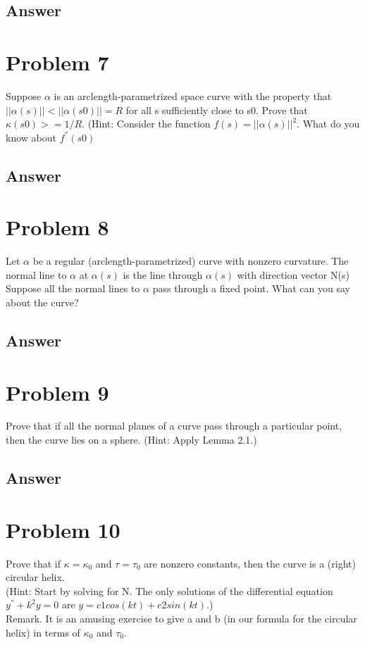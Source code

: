 \documentclass[
	12pt, %
]{fphw}
\theoremstyle{plain}
\begin{document}
\subsection*{Answer}
\section*{Problem 7}
\begin{problem}
     Suppose \(\alpha\) is an arclength-parametrized space curve with the property that $||\alpha(s)||<||\alpha(s0)|| = R$ for
all s sufficiently close to s0. Prove that \(\kappa(s0) >= 1/R\). (Hint: Consider the function $f (s) = ||\alpha(s)||^{2}$.
What do you know about \(f^{''} (s0)\)
\end{problem}
\subsection*{Answer}
\section*{Problem 8}
\begin{problem}
     Let $\alpha$ be a regular (arclength-parametrized) curve with nonzero curvature. The normal line to $\alpha$ at $\alpha(s)$
is the line through $\alpha(s)$ with direction vector N(s) Suppose all the normal lines to $\alpha$ pass through a fixed point. What can you say about the curve?
\end{problem}
\subsection*{Answer}
\section*{Problem 9}
\begin{problem}
     Prove that if all the normal planes of a curve pass through a particular point, then the curve lies on a sphere. (Hint: Apply Lemma 2.1.)
\end{problem}
\subsection*{Answer}
\section*{Problem 10}
\begin{problem}
     Prove that if $\kappa = \kappa_{0}$ and $\tau = \tau_{0}$ are nonzero constants, then the curve is a (right) circular helix.\\
     (Hint: Start by solving for N. The only solutions of the differential equation $y^{''} + k^2 y = 0$ are $y = c1 cos(kt) + c2 sin(kt)$.)\\
     Remark. It is an amusing exercise to give a and b (in our formula for the circular helix) in terms
of $\kappa_{0}$ and $\tau_{0}$.
\end{problem}
\end{document}
